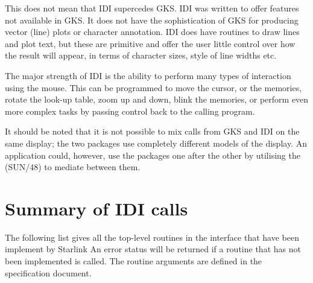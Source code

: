 This does not mean that IDI supercedes GKS. IDI was written to offer
features not available in GKS. It does not have the sophistication of
GKS for producing vector (line) plots or character annotation. IDI
does have routines to draw lines and plot text, but these are primitive
and offer the user little control over how the result will appear, in
terms of character sizes, style of line widths etc.

The major strength of IDI is the ability to perform many types of
interaction using the mouse. This can be programmed to move the cursor,
or the memories, rotate the look-up table, zoom up and down, blink the
memories, or perform even more complex tasks by passing control back
to the calling program.

It should be noted that it is not possible to mix calls from GKS and IDI
on the same display; the two packages use completely different models
of the display. An application could, however, use the packages one after
the other by utilising the  (SUN/48) to mediate between them.


\section{Summary of IDI calls}

The following list gives all the top-level routines in the interface that
have been implement by Starlink
An error status will be returned if a routine that has not been implemented
is called. The routine arguments are defined in the specification 
document.

